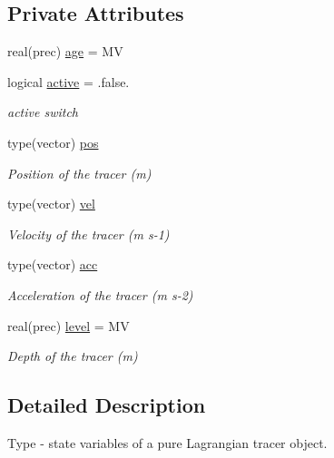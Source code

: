 \subsection*{Private Attributes}
\begin{DoxyCompactItemize}
\item 
real(prec) \mbox{\hyperlink{structtracerbase__mod_1_1tracer__state__class_aabf14569a79276d6cdd0f0a537cfb046}{age}} = MV
\item 
logical \mbox{\hyperlink{structtracerbase__mod_1_1tracer__state__class_a40841af58b7434716bc8d87bf1b3b694}{active}} = .false.
\begin{DoxyCompactList}\small\item\em active switch \end{DoxyCompactList}\item 
type(vector) \mbox{\hyperlink{structtracerbase__mod_1_1tracer__state__class_a184b3ecbe519a6cc7468fa3060131ce0}{pos}}
\begin{DoxyCompactList}\small\item\em Position of the tracer (m) \end{DoxyCompactList}\item 
type(vector) \mbox{\hyperlink{structtracerbase__mod_1_1tracer__state__class_ae94928588f703077bae9de12c8e9d14b}{vel}}
\begin{DoxyCompactList}\small\item\em Velocity of the tracer (m s-\/1) \end{DoxyCompactList}\item 
type(vector) \mbox{\hyperlink{structtracerbase__mod_1_1tracer__state__class_a056eb4f0a99aebbbae7ca7ebf15dbdf2}{acc}}
\begin{DoxyCompactList}\small\item\em Acceleration of the tracer (m s-\/2) \end{DoxyCompactList}\item 
real(prec) \mbox{\hyperlink{structtracerbase__mod_1_1tracer__state__class_aab144782751a09c5798e03e5eb4133d7}{level}} = MV
\begin{DoxyCompactList}\small\item\em Depth of the tracer (m) \end{DoxyCompactList}\end{DoxyCompactItemize}


\subsection{Detailed Description}
Type -\/ state variables of a pure Lagrangian tracer object. 

